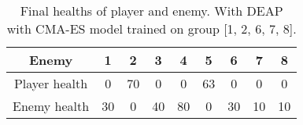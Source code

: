 \begin{table}[ht]\centering
\begin{tabular}{|c|c|c|c|c|c|c|c|c|}
\hline
Enemy & 1 & 2 & 3 & 4 & 5 & 6 & 7 & 8\\
\hline
Player health & 0 & 70 & 0 & 0 & 63 & 0 & 0 & 0\\
\hline
Enemy health & 30 & 0 & 40 & 80 & 0 & 30 & 10 & 10\\
\hline
\end{tabular}
\caption{Final healths of player and enemy. With DEAP with CMA-ES  model trained on group [1, 2, 6, 7, 8].}
\label{tab:test_DEAP_1_2_6_7_8}
\end{table}